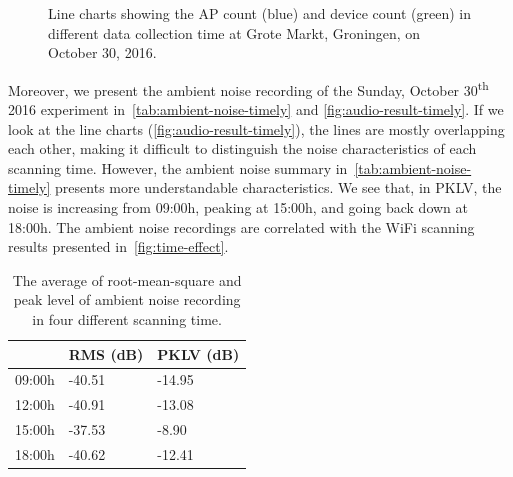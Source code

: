 \begin{figure}[H]
\begin{adjustwidth}{-3cm}{}
{{		  }
		}
		\caption[Line charts of ambient noise on October 30, 2016.]
		{Line charts showing the \ac{AP} count (blue) and device count (green) in different data collection time at Grote Markt, Groningen, on October 30, 2016.}
		\label{fig:time-effect}
		\end{adjustwidth}
	\end{figure}

	Moreover, we present the ambient noise recording of the Sunday, October 30\textsuperscript{th} 2016 experiment in~\autoref{tab:ambient-noise-timely} and \autoref{fig:audio-result-timely}. If we look at the line charts (\autoref{fig:audio-result-timely}), the lines are mostly overlapping each other, making it difficult to distinguish the noise characteristics of each scanning time. However, the ambient noise summary in~\autoref{tab:ambient-noise-timely} presents more understandable characteristics. We see that, in \ac{PKLV}, the noise is increasing from 09:00h, peaking at 15:00h, and going back down at 18:00h. The ambient noise recordings are correlated with the WiFi scanning results presented in~\autoref{fig:time-effect}.

	\begin{table}[h]
	\centering
	\caption[The average of RMS and PKLV of ambient noise in four scanning time.]
	{The average of root-mean-square and peak level of ambient noise recording in four different scanning time.}
	\label{tab:ambient-noise-timely}
	\begin{tabular}{lll}
	\toprule
	       & \ac{RMS} (dB) & \ac{PKLV} (dB) \\ \midrule
	09:00h & -40.51        & -14.95          \\
	12:00h & -40.91        & -13.08          \\
	15:00h & -37.53        & -8.90           \\
	18:00h & -40.62        & -12.41          \\ \bottomrule
	\end{tabular}
	\end{table}

